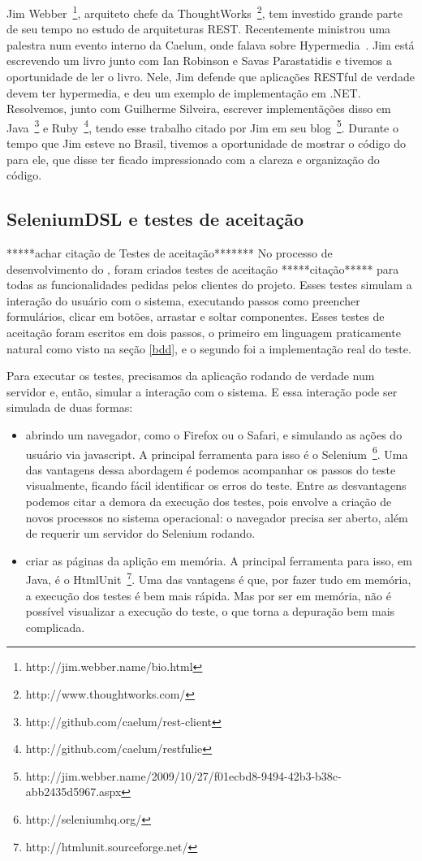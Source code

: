 Jim Webber~\footnote{http://jim.webber.name/bio.html}, arquiteto chefe da ThoughtWorks~\footnote{http://www.thoughtworks.com/},
tem investido grande parte de seu tempo no estudo de arquiteturas REST. Recentemente ministrou uma palestra num evento interno
da Caelum, onde falava sobre Hypermedia~\cite{rest-jim}.
Jim está escrevendo um livro junto com Ian Robinson e Savas Parastatidis e tivemos a oportunidade de ler o livro. Nele, Jim 
defende que aplicações RESTful de verdade devem ter hypermedia, e deu um exemplo de implementação em .NET. Resolvemos, junto com
Guilherme Silveira, escrever implementãções disso em Java~\footnote{http://github.com/caelum/rest-client} e 
Ruby~\footnote{http://github.com/caelum/restfulie}, tendo esse trabalho citado por Jim em seu 
blog~\footnote{http://jim.webber.name/2009/10/27/f01ecbd8-9494-42b3-b38c-abb2435d5967.aspx}.
Durante o tempo que Jim esteve no Brasil, tivemos a oportunidade de mostrar o código do \calopsita para ele, que disse ter
ficado impressionado com a clareza e organização do código.

\subsection{SeleniumDSL e testes de aceitação}
*****achar citação de Testes de aceitação*******
No processo de desenvolvimento do \calopsita, foram criados testes de aceitação *****citação***** para todas as
funcionalidades pedidas pelos clientes do projeto. Esses testes simulam a interação do usuário com o sistema, executando
passos como preencher formulários, clicar em botões, arrastar e soltar componentes. Esses testes de aceitação
foram escritos em dois passos, o primeiro em linguagem praticamente natural como visto na seção \ref{bdd}, e o segundo
foi a implementação real do teste.

Para executar os testes, precisamos da aplicação rodando de verdade num servidor e, então, simular a interação com 
o sistema. E essa interação pode ser simulada de duas formas:
\begin{itemize}
	\item{abrindo um navegador, como o Firefox ou o Safari, e simulando as ações do usuário via javascript. A principal
	ferramenta para isso é o Selenium~\footnote{http://seleniumhq.org/}. Uma das vantagens dessa abordagem é podemos
	acompanhar os passos do teste visualmente, ficando fácil identificar os erros do teste. Entre as desvantagens podemos
	citar a demora da execução dos testes, pois envolve a criação de novos processos no sistema operacional: o navegador
	precisa ser aberto, além de requerir um servidor do Selenium rodando.}
	\item{criar as páginas da aplição em memória. A principal ferramenta para isso, em Java, é o 
	HtmlUnit~\footnote{http://htmlunit.sourceforge.net/}. Uma das vantagens é que, por fazer tudo em memória, a execução
	dos testes é bem mais rápida. Mas por ser em memória, não é possível visualizar a execução do teste, o que torna
	a depuração bem mais complicada.}
\end{itemize}

